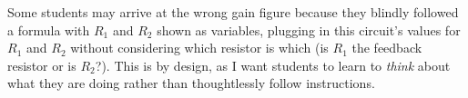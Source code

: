 Some students may arrive at the wrong gain figure because they blindly followed a formula with $R_1$ and $R_2$ shown as variables, plugging in this circuit's values for $R_1$ and $R_2$ without considering which resistor is which (is $R_1$ the feedback resistor or is $R_2$?).  This is by design, as I want students to learn to {\it think} about what they are doing rather than thoughtlessly follow instructions.




